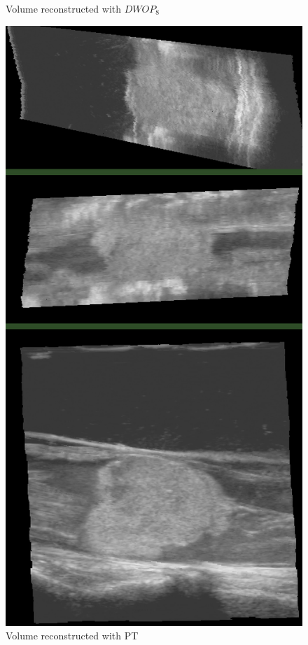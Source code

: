 \begin{figure}
\begin{minipage}[b]{0.326\textwidth}
	\caption{Volume reconstructed with $DWOP_8$}
	\label{fig:large_dwop8}
\end{minipage}
\hspace{0.01\textwidth}
\begin{minipage}[b]{0.326\textwidth}
	\centering
	\includegraphics[width=\textwidth]{graphics/large_pt.png}
	\caption{Volume reconstructed with PT}
	\label{fig:large_pt}
\end{minipage}
\end{figure}

